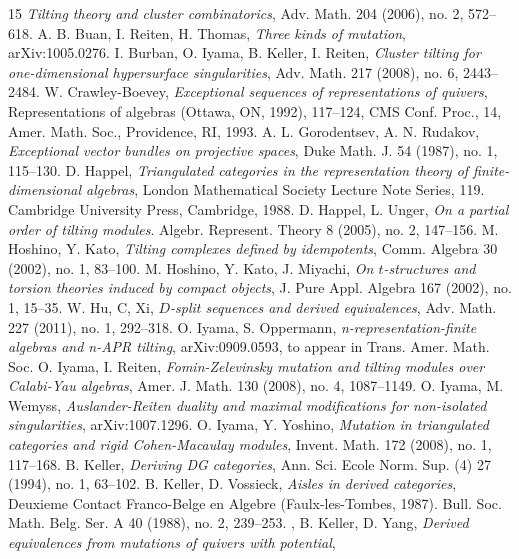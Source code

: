 \documentclass[a4paper,reqno]{amsart}
\theoremstyle{definition}
\begin{document}
\begin{thebibliography}{15}
\emph{Tilting theory and cluster combinatorics}, Adv. Math. 204 (2006), no. 2, 572--618.
 A. B. Buan, I. Reiten, H. Thomas, \emph{Three kinds of mutation}, arXiv:1005.0276.
 I. Burban, O. Iyama, B. Keller, I. Reiten,
\emph{Cluster tilting for one-dimensional hypersurface singularities},
Adv. Math. 217 (2008), no. 6, 2443--2484.
 W. Crawley-Boevey, \emph{Exceptional sequences of representations of quivers}, 
Representations of algebras (Ottawa, ON, 1992), 117--124, CMS Conf. Proc., 14, Amer. Math. Soc., Providence, RI, 1993. 
 A. L. Gorodentsev, A. N. Rudakov, \emph{Exceptional vector bundles on projective spaces}, 
Duke Math. J. 54 (1987), no. 1, 115--130.
 D. Happel, \emph{Triangulated categories in the representation theory of finite-dimensional algebras}, 
London Mathematical Society Lecture Note Series, 119. Cambridge University Press, Cambridge, 1988.
 D. Happel, L. Unger, \emph{On a partial order of tilting modules}. 
Algebr. Represent. Theory 8 (2005), no. 2, 147--156.
 M. Hoshino, Y. Kato, \emph{Tilting complexes defined by idempotents}, Comm. Algebra 30 (2002), no. 1, 83--100.
 M. Hoshino, Y. Kato, J. Miyachi, \emph{On $t$-structures and torsion theories induced by compact objects}, 
J. Pure Appl. Algebra 167 (2002), no. 1, 15--35. 
 W. Hu, C, Xi,
\emph{$D$-split sequences and derived equivalences}, Adv. Math. 227 (2011), no. 1, 292--318.
 O. Iyama, S. Oppermann,
\emph{n-representation-finite algebras and n-APR tilting},
arXiv:0909.0593, to appear in Trans. Amer. Math. Soc.
 O. Iyama, I. Reiten, 
\emph{Fomin-Zelevinsky mutation and tilting modules over Calabi-Yau algebras},
Amer. J. Math. 130 (2008), no. 4, 1087--1149.
 O. Iyama, M. Wemyss, \emph{Auslander-Reiten duality and maximal modifications for non-isolated singularities},
arXiv:1007.1296.
 O. Iyama, Y. Yoshino, \emph{Mutation in triangulated categories and rigid Cohen-Macaulay modules}, 
Invent. Math. 172 (2008), no. 1, 117--168.
 B. Keller, \emph{Deriving DG categories},
Ann. Sci. Ecole Norm. Sup. (4) 27 (1994), no. 1, 63--102. 
 B. Keller, D. Vossieck, \emph{Aisles in derived categories},
Deuxieme Contact Franco-Belge en Algebre (Faulx-les-Tombes, 1987).
Bull. Soc. Math. Belg. Ser. A 40 (1988), no. 2, 239--253.
, B. Keller, D. Yang, \emph{Derived equivalences from mutations of quivers with potential},

\end{thebibliography}
\end{document}
